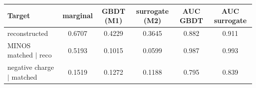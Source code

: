 \begin{tabular}{lccccc}
\toprule
Target & marginal & GBDT (M1) & surrogate (M2) & AUC GBDT & AUC surrogate \\
\midrule
reconstructed & 0.6707 & 0.4229 & 0.3645 & 0.882 & 0.911 \\
MINOS matched $\mid$ reco & 0.5193 & 0.1015 & 0.0599 & 0.987 & 0.993 \\
negative charge $\mid$ matched & 0.1519 & 0.1272 & 0.1188 & 0.795 & 0.839 \\
\bottomrule
\end{tabular}
